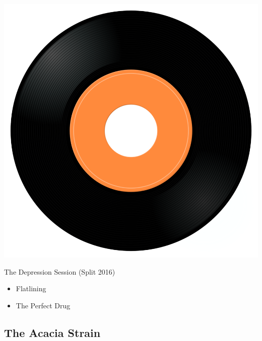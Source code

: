 \begin{minipage}[t]{0.25\textwidth}\vspace{0pt}
\captionsetup{type=figure}
\includegraphics[width=\textwidth]{Images/cover.png}
\caption*{The Depression Session (Split 2016)}
\end{minipage}
\begin{minipage}[t]{0.25\textwidth}\vspace{0pt}
\begin{itemize}[nosep,leftmargin=1em,labelwidth=*,align=left]
	\setlength{\itemsep}{0pt}
	\item Flatlining
	\item The Perfect Drug
\end{itemize}
\end{minipage}

\subsection{The Acacia Strain}

